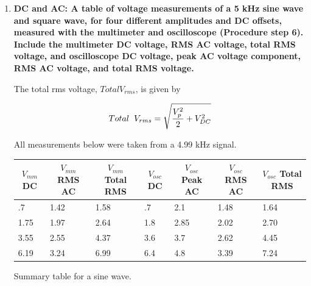 \begin{enumerate}[resume]
\item {\bf DC and AC: A table of voltage measurements of a 5 kHz sine wave and square wave, for four different amplitudes and DC offsets, measured with the multimeter and oscilloscope (Procedure step 6). Include the multimeter DC voltage, RMS AC voltage, total RMS voltage, and oscilloscope DC voltage, peak AC voltage component, RMS AC voltage, and total RMS voltage.}\newline

The total rms voltage, $Total V_{rms}$, is given by

\begin{equation*}
Total \hspace{2mm} V_{rms}=\sqrt{\dfrac{V_p^2}{2}+V_{DC}^2}
\label{equ:accg3}
\end{equation*}

All measurements below were taken from a 4.99 kHz signal.

\begin{maintable}[ht]
\center
\begin{tabular}{|l|l|l|l|l|l|l|}
\hline
\multicolumn{1}{|c|}{$V_{mm}$ DC} & \multicolumn{1}{c|}{$V_{mm}$ RMS AC} & \multicolumn{1}{c|}{$V_{mm}$ Total RMS} & \multicolumn{1}{c|}{$V_{osc}$ DC} & \multicolumn{1}{c|}{$V_{osc}$ Peak AC} & \multicolumn{1}{c|}{$V_{osc}$ RMS AC} & \multicolumn{1}{c|}{$V_{osc}$ Total RMS} \\ \hline
.7                                & 1.42                                 & 1.58                                    & .7                                & 2.1                                    & 1.48                                  & 1.64                                     \\ \hline
1.75                              & 1.97                                 & 2.64                                    & 1.8                               & 2.85                                   & 2.02                                  & 2.70                                     \\ \hline
3.55                              & 2.55                                 & 4.37                                    & 3.6                               & 3.7                                    & 2.62                                  & 4.45                                     \\ \hline
6.19                              & 3.24                                 & 6.99                                    & 6.4                               & 4.8                                    & 3.39                                  & 7.24                                     \\ \hline
\end{tabular}
\caption{Summary table for a sine wave.}
\label{tab:accg7}
\end{maintable}


\end{enumerate}
